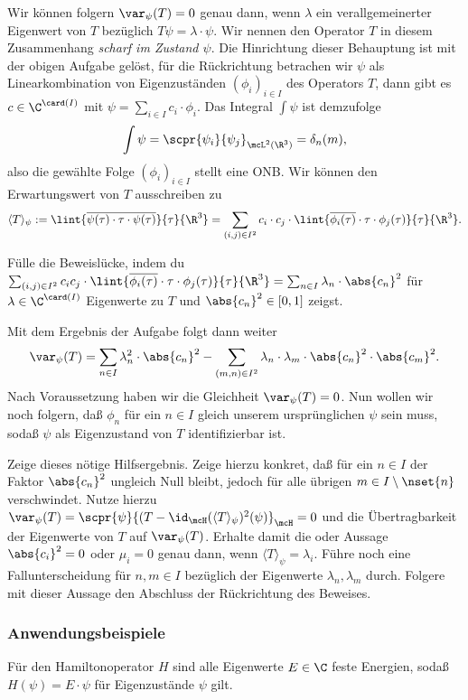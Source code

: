 \documentclass{subfiles}
\begin{document}
    Wir können folgern $\var_\psi(T) = 0$ genau dann, wenn $\lambda$ ein verallgemeinerter Eigenwert von $T$ bezüglich $T\psi = \lambda\cdot\psi$. Wir nennen den Operator $T$ in diesem Zusammenhang \emph{scharf im Zustand $\psi$}. Die Hinrichtung dieser Behauptung ist mit der obigen Aufgabe gelöst, für die Rückrichtung betrachen wir $\psi$ als Linearkombination von Eigenzuständen $(\phi_i)_{i\in I}$ des Operators $T$, dann gibt es $c\in\C^{\card(I)}$ mit $\psi = \sum_{i\in I}c_i\cdot\phi_i$. Das Integral $\int\psi$ ist demzufolge
    \[\int\psi = \scpr{\psi_i}{\psi_j}_{\mcL^2(\R^3)} = \delta_{n}(m),\]
    also die gewählte Folge $(\phi_i)_{i\in I}$ stellt eine ONB. Wir können den Erwartungswert von $T$ ausschreiben zu 
    \[\langle T\rangle_\psi := \lint{\overline{\psi(\tau)\cdot\tau\cdot\psi(\tau)}}{\tau}{\R^3} = \sum_{(i,j)\in I^2}c_i\cdot c_j\cdot\lint{\overline{\phi_i(\tau)}\cdot\tau\cdot\phi_j(\tau)}{\tau}{\R^3}.\]
    \begin{Aufgabe}
        \nr{} Fülle die Beweislücke, indem du $\sum_{(i,j)\in I^2}c_ic_j\cdot\lint{\overline{\phi_i(\tau)}\cdot\tau\cdot\phi_j(\tau)}{\tau}{\R^3} = \sum_{n\in I}\lambda_n\cdot\abs{c_n}^2$ für $\lambda\in\C^{\card(I)}$ Eigenwerte zu $T$ und $\abs{c_n}^2\in[0,1]$ zeigst. 
    \end{Aufgabe}
    Mit dem Ergebnis der Aufgabe folgt dann weiter
    \[\var_\psi(T) = \sum_{n\in I}\lambda_n^2\cdot\abs{c_n}^2 - \sum_{(m,n)\in I^2}\lambda_n\cdot\lambda_m\cdot\abs{c_n}^2\cdot\abs{c_m}^2.\]
    Nach Voraussetzung haben wir die Gleichheit $\var_\psi(T) = 0$. Nun wollen wir noch folgern, daß $\phi_n$ für ein $n\in I$ gleich unserem ursprünglichen $\psi$ sein muss, sodaß $\psi$ als Eigenzustand von $T$ identifizierbar ist. 
    \begin{Aufgabe}
        \nr{} Zeige dieses nötige Hilfsergebnis. Zeige hierzu konkret, daß für ein $n\in I$ der Faktor $\abs{c_n}^2$ ungleich Null bleibt, jedoch für alle übrigen $m\in I\setminus\nset{n}$ verschwindet. Nutze hierzu $\var_\psi(T) = \scpr{\psi}{(T-\id_\mcH(\langle T\rangle_\psi)^2(\psi)}_\mcH = 0$ und die Übertragbarkeit der Eigenwerte von $T$ auf $\var_\psi(T)$. Erhalte damit die oder Aussage $\abs{c_i}^2 = 0$ oder $\mu_i = 0$ genau dann, wenn $\langle T\rangle_\psi = \lambda_i$. Führe noch eine Fallunterscheidung für $n,m\in I$ bezüglich der Eigenwerte $\lambda_n,\lambda_m$ durch. Folgere mit dieser Aussage den Abschluss der Rückrichtung des Beweises.
    \end{Aufgabe}

    \subsubsection*{Anwendungsbeispiele}
        Für den Hamiltonoperator $H$ sind alle Eigenwerte $E\in\C$ feste Energien, sodaß $H(\psi)=E\cdot\psi$ für Eigenzustände $\psi$ gilt. \\
\end{document}
